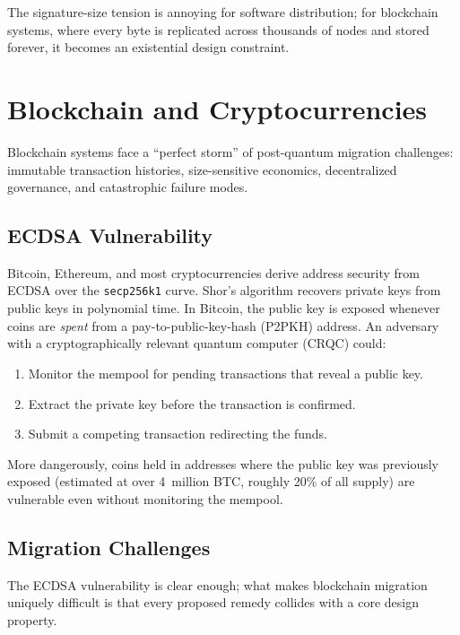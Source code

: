 The signature-size tension is annoying for software distribution; for blockchain systems, where every byte is replicated across thousands of nodes and stored forever, it becomes an existential design constraint.

\section{Blockchain and Cryptocurrencies}
\label{sec:blockchain}

Blockchain systems face a ``perfect storm'' of post-quantum migration challenges: immutable transaction histories, size-sensitive economics, decentralized governance, and catastrophic failure modes.

\subsection{ECDSA Vulnerability}
\label{subsec:ecdsa-vulnerability}

Bitcoin, Ethereum, and most cryptocurrencies derive address security from ECDSA over the \texttt{secp256k1} curve.  Shor's algorithm recovers private keys from public keys in polynomial time.  In Bitcoin, the public key is exposed whenever coins are \emph{spent} from a pay-to-public-key-hash (P2PKH) address.  An adversary with a cryptographically relevant quantum computer (CRQC) could:
\begin{enumerate}
\item Monitor the mempool for pending transactions that reveal a public key.
\item Extract the private key before the transaction is confirmed.
\item Submit a competing transaction redirecting the funds.
\end{enumerate}

More dangerously, coins held in addresses where the public key was previously exposed (estimated at over 4~million BTC, roughly 20\% of all supply) are vulnerable even without monitoring the mempool.

\subsection{Migration Challenges}
\label{subsec:blockchain-migration}

The ECDSA vulnerability is clear enough; what makes blockchain migration uniquely difficult is that every proposed remedy collides with a core design property.

